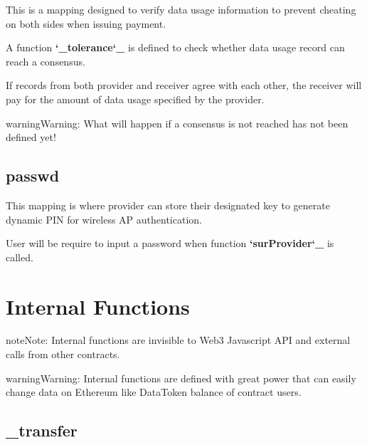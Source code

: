 \documentclass[letterpaper,10pt,english]{sphinxmanual}
\begin{document}
This is a mapping designed to verify data usage information to prevent cheating on both sides when issuing payment.

A function {\color{red}\bfseries{}{}`\_tolerance{}`\_} is defined to check whether data usage record can reach a consensus.

If records from both provider and receiver agree with each other, the receiver will pay for the amount of data usage specified by the provider.

\begin{sphinxadmonition}{warning}{Warning:}
What will happen if a consensus is not reached has not been defined yet!
\end{sphinxadmonition}


\subsection{passwd}
\label{\detokenize{ContractVariables:passwd}}
%
\begin{sphinxVerbatim}[commandchars=\\\{\}]
     
\end{sphinxVerbatim}

This mapping is where provider can store their designated key to generate dynamic PIN for wireless AP authentication.

User will be require to input a password when function {\color{red}\bfseries{}{}`surProvider{}`\_} is called.


\section{Internal Functions}
\label{\detokenize{InternalFunctions::doc}}\label{\detokenize{InternalFunctions:internal-functions}}
\begin{sphinxadmonition}{note}{Note:}
Internal functions are invisible to Web3 Javascript API and external calls from other contracts.
\end{sphinxadmonition}

\begin{sphinxadmonition}{warning}{Warning:}
Internal functions are defined with great power that can easily change data on Ethereum like DataToken balance of contract users.
\end{sphinxadmonition}


\subsection{\_transfer}
\label{\detokenize{InternalFunctions:transfer}}
%
\begin{sphinxVerbatim}[commandchars=\\\{\}]
      
\end{sphinxVerbatim}
\end{document}
